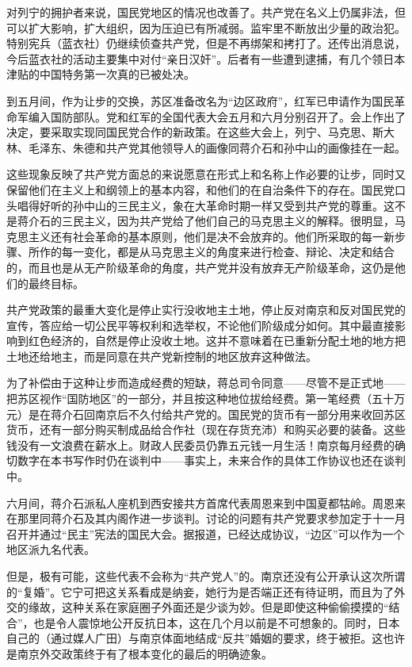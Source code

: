 \documentclass[10pt]{book}
\begin{document}
对列宁的拥护者来说，国民党地区的情况也改善了。共产党在名义上仍属非法，但可以扩大影响，扩大组织，因为压迫已有所减弱。监牢里不断放出少量的政治犯。特别宪兵（蓝衣社）仍继续侦查共产党，但是不再绑架和拷打了。还传出消息说，今后蓝衣社的活动主要集中对付“亲日汉奸”。后者有一些遭到逮捕，有几个领日本津贴的中国特务第一次真的已被处决。

到五月间，作为让步的交换，苏区准备改名为“边区政府”，红军已申请作为国民革命军编入国防部队。党和红军的全国代表大会五月和六月分别召开了。会上作出了决定，要采取实现同国民党合作的新政策。在这些大会上，列宁、马克思、斯大林、毛泽东、朱德和共产党其他领导人的画像同蒋介石和孙中山的画像挂在一起。

这些现象反映了共产党方面总的来说愿意在形式上和名称上作必要的让步，同时又保留他们在主义上和纲领上的基本内容，和他们的在自治条件下的存在。国民党口头唱得好听的孙中山的三民主义，象在大革命时期一样又受到共产党的尊重。这不是蒋介石的三民主义，因为共产党给了他们自己的马克思主义的解释。很明显，马克思主义还有社会革命的基本原则，他们是决不会放弃的。他们所采取的每一新步骤、所作的每一变化，都是从马克思主义的角度来进行检查、辩论、决定和结合的，而且也是从无产阶级革命的角度，共产党并没有放弃无产阶级革命，这仍是他们的最终目标。

共产党政策的最重大变化是停止实行没收地主土地，停止反对南京和反对国民党的宣传，答应给一切公民平等权利和选举权，不论他们阶级成分如何。其中最直接影响到红色经济的，自然是停止没收土地。这并不意味着在已重新分配土地的地方把土地还给地主，而是同意在共产党新控制的地区放弃这种做法。

为了补偿由于这种让步而造成经费的短缺，蒋总司令同意——尽管不是正式地——把苏区视作“国防地区”的一部分，并且按这种地位拔给经费。第一笔经费（五十万元）是在蒋介石回南京后不久付给共产党的。国民党的货币有一部分用来收回苏区货币，还有一部分购买制成品给合作社（现在存货充沛）和购买必要的装备。这些钱没有一文浪费在薪水上。财政人民委员仍靠五元钱一月生活！南京每月经费的确切数字在本书写作时仍在谈判中——事实上，未来合作的具体工作协议也还在谈判中。

六月间，蒋介石派私人座机到西安接共方首席代表周恩来到中国夏都牯岭。周恩来在那里同蒋介石及其内阁作进一步谈判。讨论的问题有共产党要求参加定于十一月召开并通过“民主”宪法的国民大会。据报道，已经达成协议，“边区”可以作为一个地区派九名代表。

但是，极有可能，这些代表不会称为“共产党人”的。南京还没有公开承认这次所谓的“复婚”。它宁可把这关系看成是纳妾，她行为是否端正还有待证明，而且为了外交的缘故，这种关系在家庭圈子外面还是少谈为妙。但是即使这种偷偷摸摸的“结合”，也是令人震惊地公开反抗日本，这在几个月以前是不可想象的。同时，日本自己的（通过媒人广田）与南京体面地结成“反共”婚姻的要求，终于被拒。这也许是南京外交政策终于有了根本变化的最后的明确迹象。
\end{document}
